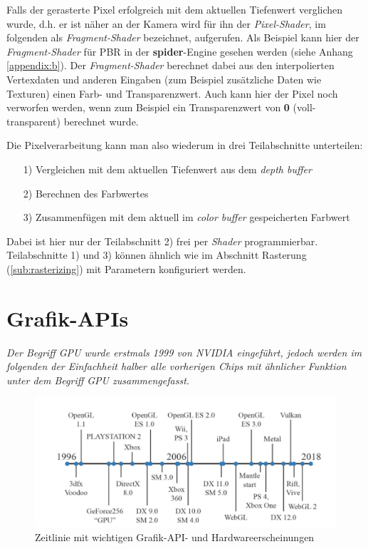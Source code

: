 \documentclass[oneside]{ausarbeitung}
\newcommand*{\quotize}[1]{\glqq #1\grqq}
\begin{document}
Falls der gerasterte Pixel erfolgreich mit dem aktuellen Tiefenwert verglichen wurde, d.h. er ist näher an der Kamera wird für ihn der \textit{Pixel-Shader}, im folgenden als \textit{Fragment-Shader} bezeichnet, aufgerufen. Als Beispiel kann hier der \textit{Fragment-Shader} für \ac{PBR} in der \textbf{spider}-Engine gesehen werden (siehe Anhang \ref{appendix:b}). Der  \textit{Fragment-Shader} berechnet dabei aus den interpolierten Vertexdaten und anderen Eingaben (zum Beispiel zusätzliche Daten wie Texturen) einen Farb- und Transparenzwert. Auch kann hier der Pixel noch verworfen werden, wenn zum Beispiel ein Transparenzwert von \textbf{0} (voll-transparent) berechnet wurde.

Die Pixelverarbeitung kann man also wiederum in drei Teilabschnitte unterteilen: 
\begin{itemize}
\item[1)]{Vergleichen mit dem aktuellen Tiefenwert aus dem \textit{depth buffer}}
\item[2)]{Berechnen des Farbwertes}
\item[3)]{Zusammenfügen mit dem aktuell im \textit{color buffer} gespeicherten Farbwert}
\end{itemize} 
Dabei ist hier nur der Teilabschnitt 2) frei per \textit{Shader} programmierbar. Teilabschnitte 1) und 3) können ähnlich wie im Abschnitt Rasterung (\ref{sub:rasterizing}) mit Parametern konfiguriert werden.

\section{Grafik-APIs \cite[Vgl.][The Evolution of Programmable Shading and APIs]{real_time_rendering}}
\textit{Der Begriff \quotize{\ac{GPU}} wurde erstmals 1999 von NVIDIA eingeführt, jedoch werden im folgenden der Einfachheit halber alle vorherigen Chips mit ähnlicher Funktion unter dem Begriff \quotize{\ac{GPU}} zusammengefasst.}

\begin{figure}
    \includegraphics[width=\textwidth]{images/api_timeline.png}
    \caption{Zeitlinie mit wichtigen Grafik-API- und Hardwareerscheinungen \cite[S. 38]{real_time_rendering}}
    \label{fig:barycentric_color}
\end{figure}
\end{document}
